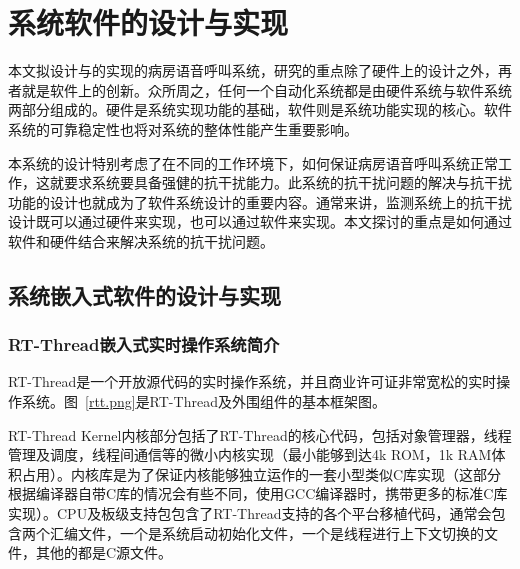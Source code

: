 
\chapter{系统软件的设计与实现}
本文拟设计与的实现的病房语音呼叫系统，研究的重点除了硬件上的设计之外，再者就是软件上的创新。众所周之，任何一个自动化系统都是由硬件系统与软件系统两部分组成的。硬件是系统实现功能的基础，软件则是系统功能实现的核心。软件系统的可靠稳定性也将对系统的整体性能产生重要影响。

本系统的设计特别考虑了在不同的工作环境下，如何保证病房语音呼叫系统正常工作，这就要求系统要具备强健的抗干扰能力。此系统的抗干扰问题的解决与抗干扰功能的设计也就成为了软件系统设计的重要内容。通常来讲，监测系统上的抗干扰设计既可以通过硬件来实现，也可以通过软件来实现。本文探讨的重点是如何通过软件和硬件结合来解决系统的抗干扰问题。

\section{系统嵌入式软件的设计与实现}
\subsection{RT-Thread嵌入式实时操作系统简介}
RT-Thread是一个开放源代码的实时操作系统，并且商业许可证非常宽松的实时操作系统。图~\ref{rtt.png}是RT-Thread及外围组件的基本框架图。

RT-Thread Kernel内{\cf}核部{\cf}分包{\cf}括了{\cf}RT{\cf}-T{\cf}hr{\cf}ea{\cf}d的{\cf}核心{\cf}代码{\cf}，包{\cf}括对{\cf}象管{\cf}理器{\cf}，线{\cf}程管{\cf}理及{\cf}调度{\cf}，线{\cf}程间{\cf}通信{\cf}等的{\cf}微小{\cf}内核{\cf}实现{\cf}（最{\cf}小能{\cf}够到{\cf}达4{\cf}k {\cf}RO{\cf}M，{\cf}1k{\cf} R{\cf}AM{\cf}体积{\cf}占用{\cf}）。{\cf}内核{\cf}库是{\cf}为了{\cf}保证{\cf}内核{\cf}能够{\cf}独立{\cf}运作{\cf}的一{\cf}套小{\cf}型类{\cf}似C{\cf}库实{\cf}现（{\cf}这部{\cf}分根{\cf}据编{\cf}译器{\cf}自带{\cf}C库{\cf}的情{\cf}况会{\cf}有些{\cf}不同{\cf}，使{\cf}用G{\cf}CC{\cf}编译{\cf}器时{\cf}，携{\cf}带更{\cf}多的{\cf}标准{\cf}C库{\cf}实现{\cf}）。{\cf}CP{\cf}U及{\cf}板级{\cf}支持{\cf}包包{\cf}含了{\cf}RT{\cf}-T{\cf}hr{\cf}ea{\cf}d支{\cf}持的{\cf}各个{\cf}平台{\cf}移植{\cf}代码{\cf}，通{\cf}常会{\cf}包含{\cf}两个{\cf}汇编{\cf}文件{\cf}，一{\cf}个是{\cf}系统{\cf}启动{\cf}初始{\cf}化文{\cf}件，{\cf}一个{\cf}是线{\cf}程进{\cf}行上{\cf}下文{\cf}切换{\cf}的文{\cf}件，{\cf}其他{\cf}的都{\cf}是C{\cf}源文{\cf}件。

